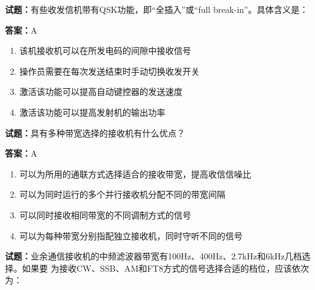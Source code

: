 \documentclass{ctexbook}
\begin{document}




\vspace{1em}

\textbf{试题：}有些收发信机带有QSK功能，即“全插入”或“full break-in”。具体含义是： 

\textbf{答案：}A 

\begin{enumerate}[leftmargin=3em]
  \item 该机接收机可以在所发电码的间隙中接收信号 

  \item 操作员需要在每次发送结束时手动切换收发开关 

  \item 激活该功能可以提高自动键控器的发送速度 

  \item 激活该功能可以提高发射机的输出功率 

\end{enumerate}





\vspace{1em}

\textbf{试题：}具有多种带宽选择的接收机有什么优点？ 

\textbf{答案：}A 

\begin{enumerate}[leftmargin=3em]
  \item 可以为所用的通联方式选择适合的接收带宽，提高收信信噪比 

  \item 可以为同时运行的多个并行接收机分配不同的带宽间隔 

  \item 可以同时接收相同带宽的不同调制方式的信号 

  \item 可以为每种带宽分别指配独立接收机，同时守听不同的信号 

\end{enumerate}






\vspace{1em}

\textbf{试题：}业余通信接收机的中频滤波器带宽有100Hz、400Hz、2.7kHz和6kHz几档选择。如果要
为接收CW、SSB、AM和FT8方式的信号选择合适的档位，应该依次为： 
\end{document}

